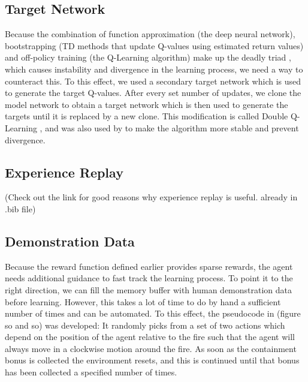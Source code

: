 \subsection{Target Network}\label{sec:target_network}
Because the combination of function approximation (the deep neural network), bootstrapping (TD methods that update Q-values using estimated return values) and off-policy training (the Q-Learning algorithm) make up the deadly triad \citep{sutton_barto_2018}, which causes instability and divergence in the learning process, we need a way to counteract this. To this effect, we used a secondary target network which is used to generate the target Q-values. After every set number of updates, we clone the model network to obtain a target network which is then used to generate the targets until it is replaced by a new clone. This modification is called Double Q-Learning \citep{NIPS2010_3964}, and was also used by \citep{mnih2015human} to make the algorithm more stable and prevent divergence.

\subsection{Experience Replay}\label{sec:exp_replay}
(Check out the link for good reasons why experience replay is useful. already in .bib file)

\subsection{Demonstration Data}\label{sec:demo_data}
Because the reward function defined earlier provides sparse rewards, the agent needs additional guidance to fast track the learning process. To point it to the right direction, we can fill the memory buffer with human demonstration data before learning. However, this takes a lot of time to do by hand a sufficient number of times and can be automated. To this effect, the pseudocode in (figure so and so) was developed: It randomly picks from a set of two actions which depend on the position of the agent relative to the fire such that the agent will always move in a clockwise motion around the fire. As soon as the containment bonus is collected the environment resets, and this is continued until that bonus has been collected a specified number of times.
